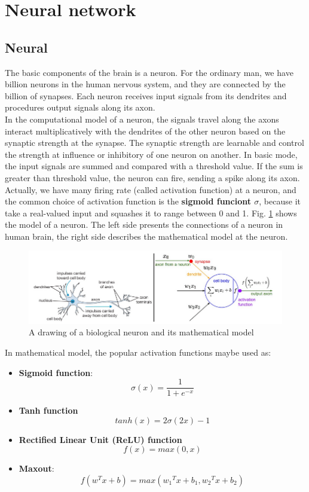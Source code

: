 \section{Neural network}
\subsection{Neural}
The basic components of the brain is a neuron. For the ordinary man, we have billion neurons in the human nervous system, and they are connected by the billion of synapses. Each neuron receives input signals from its dendrites and procedures output signals along its axon.\\[0.2cm]
In the computational model of a neuron, the signals travel along the axons interact multiplicatively with the dendrites of the other neuron based on the synaptic strength at the synapse. The synaptic strength are learnable and control the strength at influence or inhibitory of one neuron on another. In basic mode, the input signals are summed and compared with a threshold value. If the sum is greater than threshold value, the neuron can fire, sending a spike along its axon. Actually, we have many firing rate (called activation function) at a neuron, and the common choice of activation function is the \textbf{sigmoid funciont $\sigma$}, because it take a real-valued input and squashes it to range between 0 and 1. Fig. \ref{fignneuron} shows the model of a neuron. The left side presents the connections of a neuron in human brain, the right side describes the mathematical model at the neuron.
\begin{figure}[h]
	\centering
	\includegraphics[scale=0.5]{images/neurons.png}
	\caption{A drawing of a biological neuron and its mathematical model}
	\label{fignneuron}
\end{figure}

In mathematical model, the popular activation functions maybe used as:
\begin{itemize}
	\item \textbf{Sigmoid function}:
		\begin{equation}
			\sigma(x) = \frac{1}{1+e^{-x}}
		\end{equation}
	\item \textbf{Tanh function}
		\begin{equation}
			tanh(x) = 2\sigma(2x) - 1
		\end{equation}
	\item \textbf{Rectified Linear Unit (ReLU) function}
		\begin{equation}
			f(x) = max(0,x)
		\end{equation}
	\item \textbf{Maxout}:
		\begin{equation}
			f(w^Tx + b) = max({w_1}^Tx + b_1,{w_2}^Tx + b_2)
		\end{equation}
\end{itemize}
